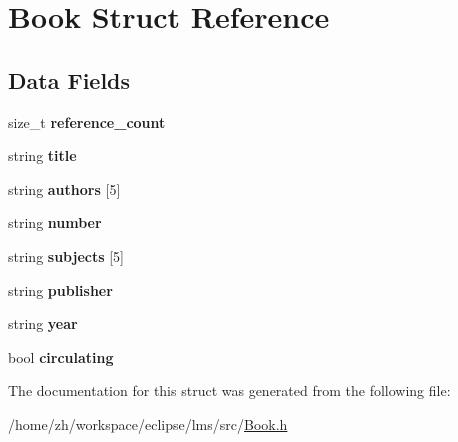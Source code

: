 \hypertarget{structBook}{\section{Book Struct Reference}
\label{structBook}
}
\subsection*{Data Fields}
\begin{DoxyCompactItemize}
\item 
\hypertarget{structBook_ab7befd3dbd3056a286a12e9fad0960d6}{size\-\_\-t {\bfseries reference\-\_\-count}}\label{structBook_ab7befd3dbd3056a286a12e9fad0960d6}

\item 
\hypertarget{structBook_a694d90d6902d5f9d280db89ba533fad6}{string {\bfseries title}}\label{structBook_a694d90d6902d5f9d280db89ba533fad6}

\item 
\hypertarget{structBook_ac25dffd3f575b6728c8343f10070c15a}{string {\bfseries authors} \mbox{[}5\mbox{]}}\label{structBook_ac25dffd3f575b6728c8343f10070c15a}

\item 
\hypertarget{structBook_a899feb6f765dc4a3c0c7ca4c326dd638}{string {\bfseries number}}\label{structBook_a899feb6f765dc4a3c0c7ca4c326dd638}

\item 
\hypertarget{structBook_abef6c666eba874862bb58f3cd5571468}{string {\bfseries subjects} \mbox{[}5\mbox{]}}\label{structBook_abef6c666eba874862bb58f3cd5571468}

\item 
\hypertarget{structBook_a37d70ef37aa29de0b9054fddb973dcf6}{string {\bfseries publisher}}\label{structBook_a37d70ef37aa29de0b9054fddb973dcf6}

\item 
\hypertarget{structBook_ae42607ff53a0dfeb8accd21434b14fd7}{string {\bfseries year}}\label{structBook_ae42607ff53a0dfeb8accd21434b14fd7}

\item 
\hypertarget{structBook_ada6b9821f0dffa514a0ab036c04b548f}{bool {\bfseries circulating}}\label{structBook_ada6b9821f0dffa514a0ab036c04b548f}

\end{DoxyCompactItemize}


The documentation for this struct was generated from the following file\-:\begin{DoxyCompactItemize}
\item 
/home/zh/workspace/eclipse/lms/src/\hyperlink{Book_8h}{Book.\-h}\end{DoxyCompactItemize}
